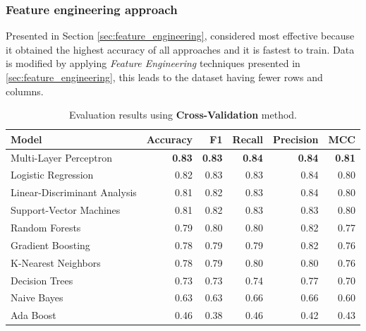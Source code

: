             \subsubsection{Feature engineering approach}
                
                Presented in Section \ref{sec:feature_engineering}, considered most effective because it obtained the highest accuracy of all approaches and it is fastest to train. Data is modified by applying \textit{Feature Engineering} techniques presented in \ref{sec:feature_engineering}, this leads to the dataset having fewer rows and columns.
            
            \begin{table}[htbp]
                \centering
                \begin{tabular}{lrrrrr}
                    \toprule
                    \textbf{Model} & \textbf{Accuracy} & \textbf{F1} & \textbf{Recall} & \textbf{Precision} & \textbf{MCC} \\
                    \midrule
                    Multi-Layer Perceptron & \textbf{0.83} & \textbf{0.83} & \textbf{0.84} & \textbf{0.84} & \textbf{0.81} \\
                    Logistic Regression & 0.82 & 0.83 & 0.83 & 0.84 & 0.80 \\
                    Linear-Discriminant Analysis & 0.81 & 0.82 & 0.83 & 0.84 & 0.80 \\
                    Support-Vector Machines & 0.81 & 0.82 & 0.83 & 0.83 & 0.80 \\
                    Random Forests & 0.79 & 0.80 & 0.80 & 0.82 & 0.77 \\
                    Gradient Boosting & 0.78 & 0.79 & 0.79 & 0.82 & 0.76 \\
                    K-Nearest Neighbors & 0.78 & 0.79 & 0.80 & 0.80 & 0.76 \\
                    Decision Trees & 0.73 & 0.73 & 0.74 & 0.77 & 0.70 \\
                    Naive Bayes & 0.63 & 0.63 & 0.66 & 0.66 & 0.60 \\
                    Ada Boost & 0.46 & 0.38 & 0.46 & 0.42 & 0.43 \\
                    \bottomrule
                \end{tabular}
                \caption{Evaluation results using \textbf{Cross-Validation} method.}
                \label{tab:feature_engineering_approach_cv}
            \end{table}

